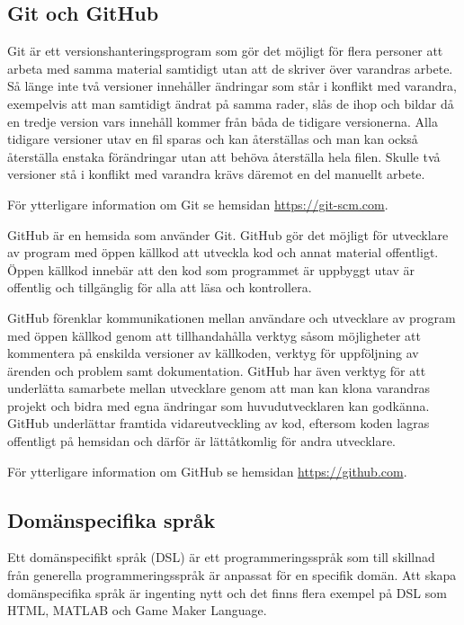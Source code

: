 \documentclass[]{article}
\begin{document}
\subsection{Git och GitHub}
Git är ett versionshanteringsprogram som gör det möjligt för flera personer att
arbeta med samma material samtidigt utan att de skriver över varandras arbete.
Så länge inte två versioner innehåller ändringar som står i konflikt med
varandra, exempelvis att man samtidigt ändrat på samma rader, slås de ihop och
bildar då en tredje version vars innehåll kommer från båda de tidigare
versionerna. Alla tidigare versioner utav en fil sparas och kan återställas och
man kan också återställa enstaka förändringar utan att behöva återställa hela
filen. Skulle två versioner stå i konflikt med varandra krävs däremot en del
manuellt arbete.

För ytterligare information om Git se hemsidan \url{https://git-scm.com}.

GitHub är en hemsida som använder Git. GitHub gör det möjligt för utvecklare av
program med öppen källkod att utveckla kod och annat material offentligt.
Öppen källkod innebär att den kod som programmet är uppbyggt utav är offentlig
och tillgänglig för alla att läsa och kontrollera.

GitHub förenklar kommunikationen mellan användare och utvecklare av program med
öppen källkod genom att tillhandahålla verktyg såsom möjligheter att kommentera
på enskilda versioner av källkoden, verktyg för uppföljning av ärenden och
problem samt dokumentation. GitHub har även verktyg för att underlätta samarbete
mellan utvecklare genom att man kan klona varandras projekt och bidra med egna
ändringar som huvudutvecklaren kan godkänna. GitHub underlättar framtida
vidareutveckling av kod, eftersom koden lagras offentligt på hemsidan och
därför är lättåtkomlig för andra utvecklare.

För ytterligare information om GitHub se hemsidan \url{https://github.com}.

\subsection{Domänspecifika språk}
Ett domänspecifikt språk (\gls{DSL}) är ett programmeringsspråk som till
skillnad från generella programmeringsspråk är anpassat för en
specifik domän. Att skapa domänspecifika språk är ingenting nytt och det
finns flera exempel på DSL som HTML, MATLAB och Game Maker Language.
\end{document}
